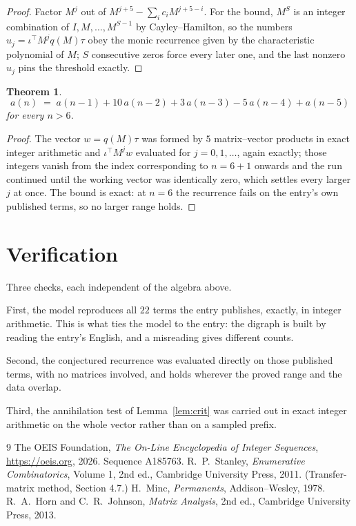 \documentclass[11pt,a4paper]{article}
\theoremstyle{plain}
\newtheorem{theorem}{Theorem}
\theoremstyle{definition}
\begin{document}
\begin{proof}
Factor $M^{j}$ out of $M^{j+5}-\sum_ic_iM^{j+5-i}$. For the bound, $M^{S}$
is an integer combination of $I,M,\dots,M^{S-1}$ by Cayley--Hamilton, so the numbers
$u_j=\iota^{\!\top}M^{j}q(M)\tau$ obey the monic recurrence given by the characteristic
polynomial of $M$; $S$ consecutive zeros force every later one, and the last nonzero $u_j$
pins the threshold exactly.
\end{proof}

\begin{theorem}
\[
a(n)\;=\;a(n-1) + 10\,a(n-2) + 3\,a(n-3) - 5\,a(n-4) + a(n-5)
\]
for every $n>6$.
\end{theorem}

\begin{proof}
The vector $w=q(M)\tau$ was formed by $5$ matrix--vector products in exact integer
arithmetic and $\iota^{\!\top}M^{j}w$ evaluated for $j=0,1,\dots$, again exactly; those
integers vanish from the index corresponding to $n=6+1$ onwards and the run continued
until the working vector was identically zero, which settles every larger $j$ at once. The bound is exact: at $n=6$ the recurrence fails on the entry's own published terms, so no larger range holds.
\end{proof}

\section{Verification}

Three checks, each independent of the algebra above.

First, the model reproduces all $22$ terms the entry publishes, exactly, in integer
arithmetic. This is what ties the model to the entry: the digraph is built by reading the
entry's English, and a misreading gives different counts.

Second, the conjectured recurrence was evaluated directly on those published terms, with no
matrices involved, and holds wherever the proved range and the data overlap.

Third, the annihilation test of Lemma~\ref{lem:crit} was carried out in exact integer
arithmetic on the whole vector rather than on a sampled prefix.

\begin{thebibliography}{9}
 The OEIS Foundation, \emph{The On-Line Encyclopedia of Integer
Sequences}, \url{https://oeis.org}, 2026. Sequence A185763.
 R.~P.~Stanley, \emph{Enumerative Combinatorics}, Volume 1, 2nd ed.,
Cambridge University Press, 2011. (Transfer-matrix method, Section 4.7.)
 H.~Minc, \emph{Permanents}, Addison--Wesley, 1978.
 R.~A.~Horn and C.~R.~Johnson, \emph{Matrix Analysis}, 2nd ed., Cambridge
University Press, 2013.
\end{thebibliography}
\end{document}
